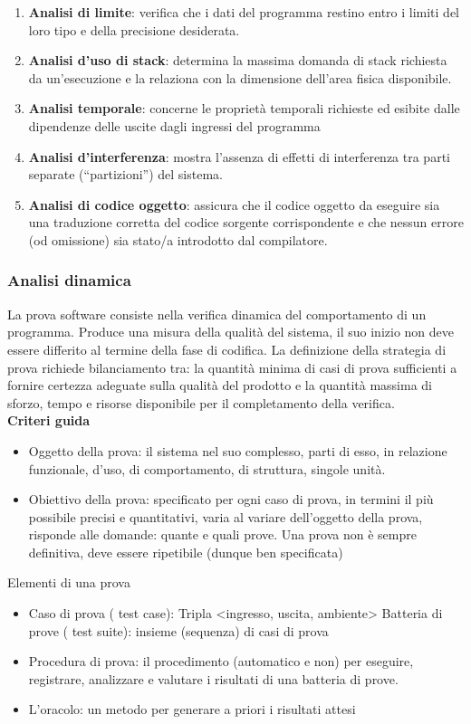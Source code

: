 \begin{enumerate}
\item \textbf{Analisi di limite}: verifica che i dati del programma restino entro i limiti del loro tipo e della precisione desiderata.
\item \textbf{Analisi d'uso di stack}: determina la massima domanda di stack richiesta da un'esecuzione e la relaziona con la dimensione dell'area fisica disponibile.
\item \textbf{Analisi temporale}: concerne le proprietà temporali richieste ed esibite dalle dipendenze delle uscite dagli ingressi del programma
\item \textbf{Analisi d'interferenza}: mostra l'assenza di effetti di interferenza tra parti separate (``partizioni'') del sistema.
\item \textbf{Analisi di codice oggetto}: assicura che il codice oggetto da eseguire sia una traduzione corretta del codice sorgente corrispondente e che nessun errore (od omissione) sia stato/a introdotto dal compilatore.
\end{enumerate}

\subsubsection{Analisi dinamica}
La prova software consiste nella verifica dinamica del comportamento di un programma.
Produce una misura della qualità del sistema, il suo inizio non deve essere differito al termine della fase di codifica. 
La definizione della strategia di prova richiede bilanciamento tra: la quantità minima di casi di prova sufficienti a fornire certezza adeguate sulla qualità del prodotto e la quantità massima di sforzo, tempo e risorse disponibile per il completamento della verifica.\\
\textbf{Criteri guida}
\begin{itemize}
\item Oggetto della prova: il sistema nel suo complesso, parti di esso, in relazione funzionale, d'uso, di comportamento, di struttura, singole unità.
\item Obiettivo della prova: specificato per ogni caso di prova, in termini il più possibile precisi e quantitativi, varia al variare dell'oggetto della prova, risponde alle domande: quante e quali prove. Una prova non è sempre definitiva, deve essere ripetibile (dunque ben specificata)
\end{itemize}
Elementi di una prova
\begin{itemize}
\item Caso di prova ( test case): Tripla <ingresso, uscita, ambiente> Batteria di prove ( test suite): insieme (sequenza) di casi di prova
\item Procedura di prova: il procedimento (automatico e non) per eseguire, registrare, analizzare e valutare i risultati di una batteria di prove.
\item L'oracolo: un metodo per generare a priori i risultati attesi
\end{itemize}


